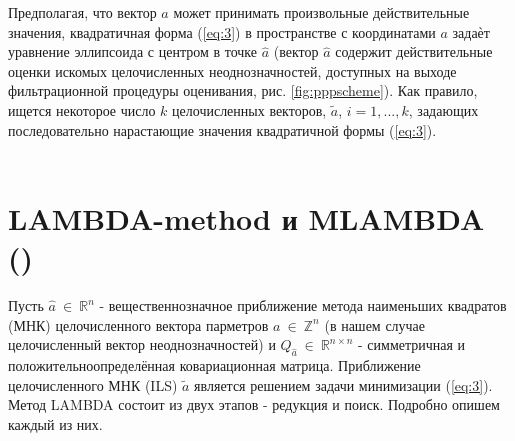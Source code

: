 \documentclass[12pt]{matmex-diploma}
\begin{document}
Предполагая, что вектор $a$ может принимать произвольные действительные
значения, квадратичная форма (\ref{eq:3}) в пространстве с координатами $a$ задаѐт
уравнение эллипсоида с центром в точке $\hat{a}$ (вектор $\hat{a}$ содержит
действительные оценки искомых целочисленных неоднозначностей, доступных на выходе
фильтрационной процедуры оценивания, рис. \ref{fig:pppscheme}). Как правило,
ищется некоторое число $k$ целочисленных векторов, $\tilde{a}$, $i = 1, ...,  k$,
задающих последовательно нарастающие значения квадратичной формы (\ref{eq:3}). \\ \\

\section{LAMBDA-method и MLAMBDA (\cite{article:mlambda})} 

Пусть $\hat{a} \ \in \ \mathbb{R}^n$ - вещественнозначное приближение метода 
наименьших квадратов (МНК) целочисленного вектора парметров $a \ \in \ \mathbb{Z}^n$
(в нашем случае целочисленный вектор неоднозначностей) и $Q_{\hat{a}} \ \in \ \mathbb{R}^{n \times n}$
- симметричная и положительноопределённая ковариационная матрица.
Приближение целочисленного МНК (ILS) $\tilde{a}$ является решением
задачи минимизации (\ref{eq:3}).
Метод LAMBDA состоит из двух этапов - редукция и поиск. Подробно опишем каждый из них.
\end{document}
